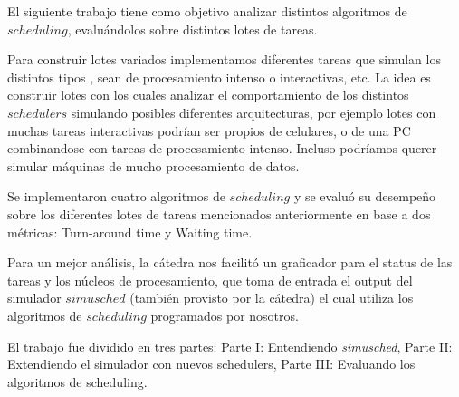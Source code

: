 El siguiente trabajo tiene como objetivo analizar distintos algoritmos de $scheduling$, evaluándolos sobre distintos lotes de tareas. 

Para construir lotes variados implementamos diferentes tareas que simulan los distintos tipos , sean de procesamiento intenso o interactivas, etc. La idea es construir lotes con los cuales analizar el comportamiento de los distintos $schedulers$ simulando posibles diferentes arquitecturas, por ejemplo lotes con muchas tareas interactivas podrían ser propios de celulares, o de una PC combinandose con tareas de procesamiento intenso. Incluso podríamos querer simular máquinas de mucho procesamiento de datos.

Se implementaron cuatro algoritmos de $scheduling$ y se evaluó su desempeño sobre los diferentes lotes de tareas mencionados anteriormente en base a dos métricas: Turn-around time y Waiting time.

Para un mejor análisis, la cátedra nos facilitó un graficador para el status de las tareas y los núcleos de procesamiento, que toma de entrada el output del simulador $simusched$ (también provisto por la cátedra) el cual utiliza los algoritmos de $scheduling$ programados por nosotros.

El trabajo fue dividido en tres partes: Parte I: Entendiendo \emph{simusched}, Parte II: Extendiendo el simulador con nuevos schedulers, Parte III: Evaluando los algoritmos de scheduling.
